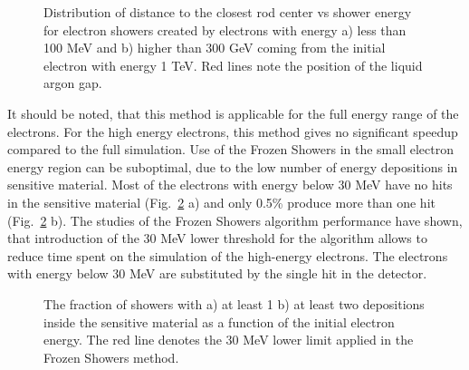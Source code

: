 \begin{figure}[!tbp]
\begin{minipage}[h]{0.49\linewidth}
\end{minipage}
\hfill
\begin{minipage}[h]{0.49\linewidth}
\end{minipage}
\caption{Distribution of distance to the closest rod center vs shower energy for electron showers created by electrons with energy a) less than 100 MeV  and b) higher than 300 GeV coming from the initial electron with energy 1 TeV.   Red lines note the position of the liquid argon gap.}
\label{fig:FSProduction2}
\end{figure}

It should be noted, that this method is applicable for the full energy range of the electrons. For the high energy electrons, this method gives no significant speedup compared to the full simulation.  Use of the Frozen Showers in the small electron energy region can be suboptimal, due to the low number of energy depositions in sensitive material. Most of the electrons with energy below 30 MeV have no hits in the sensitive material (Fig.~\ref{fig:fracHits} a) and only 0.5\% produce more than one hit (Fig.~\ref{fig:fracHits} b). The studies of the Frozen Showers algorithm performance have shown, that introduction of the 30 MeV lower threshold for the algorithm allows to reduce time spent on the simulation of the high-energy electrons. The electrons with energy below 30 MeV are substituted by the single hit in the detector.

\begin{figure}[!tbp]
\begin{minipage}[h]{0.49\linewidth}
\end{minipage}
\hfill
\begin{minipage}[h]{0.49\linewidth}
\end{minipage}
\caption{The fraction of showers with a) at least 1 b) at least two depositions inside the sensitive material as a function of the initial electron energy. The red line denotes the 30 MeV lower limit applied in the Frozen Showers method.}
\label{fig:fracHits}
\end{figure}


